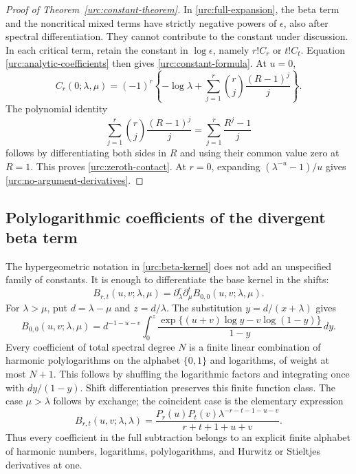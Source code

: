 \documentclass[11pt,a4paper]{article}
\theoremstyle{definition}
\theoremstyle{remark}
\numberwithin{equation}{section}
\begin{document}
\begin{proof}[Proof of Theorem~\ref{urc:constant-theorem}]
In \eqref{urc:full-expansion}, the beta term and the noncritical
mixed terms have strictly negative powers of $\epsilon$, also
after spectral differentiation. They cannot contribute to the
constant under discussion. In each critical term, retain the
constant in $\log\epsilon$, namely $r!C_r$ or $t!C_t$.
Equation \eqref{urc:analytic-coefficients} then gives
\eqref{urc:constant-formula}. At $u=0$,
\[
 C_r(0;\lambda,\mu)=(-1)^r\left\{-\log\lambda+
       \sum_{j=1}^r\binom rj\frac{(R-1)^j}{j}\right\}.
\]
The polynomial identity
\[
 \sum_{j=1}^r\binom rj\frac{(R-1)^j}{j}
       =\sum_{j=1}^r\frac{R^j-1}{j}
\]
follows by differentiating both sides in $R$ and using their common
value zero at $R=1$. This proves \eqref{urc:zeroth-contact}.
At $r=0$, expanding $(\lambda^{-u}-1)/u$ gives
\eqref{urc:no-argument-derivatives}.
\end{proof}

\subsection{Polylogarithmic coefficients of the divergent beta term}

The hypergeometric notation in \eqref{urc:beta-kernel} does not add
an unspecified family of constants. It is enough to differentiate
the base kernel in the shifts:
\[
 B_{r,t}(u,v;\lambda,\mu)
       =\partial_\lambda^r\partial_\mu^t
                      B_{0,0}(u,v;\lambda,\mu).
\]
For $\lambda>\mu$, put $d=\lambda-\mu$ and $z=d/\lambda$.
The substitution $y=d/(x+\lambda)$ gives
\begin{equation}\label{urc:polylog-beta}
 B_{0,0}(u,v;\lambda,\mu)
  =d^{-1-u-v}\int_0^z
       \frac{\exp\{(u+v)\log y-v\log(1-y)\}}{1-y}\,dy.
\end{equation}
Every coefficient of total spectral degree $N$ is a finite linear
combination of harmonic polylogarithms on the alphabet $\{0,1\}$
and logarithms, of weight at most $N+1$. This follows by shuffling
the logarithmic factors and integrating once with $dy/(1-y)$.
Shift differentiation preserves this finite function class. The
case $\mu>\lambda$ follows by exchange; the coincident case is
the elementary expression
\[
 B_{r,t}(u,v;\lambda,\lambda)
 =\frac{P_r(u)P_t(v)\lambda^{-r-t-1-u-v}}{r+t+1+u+v}.
\]
Thus every coefficient in the full subtraction belongs to an
explicit finite alphabet of harmonic numbers, logarithms,
polylogarithms, and Hurwitz or Stieltjes derivatives at one.
\end{document}
